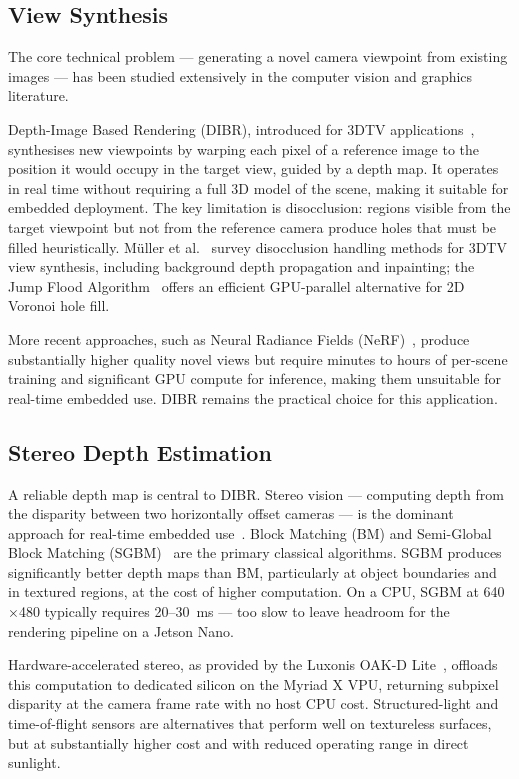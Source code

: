 \documentclass[11pt, a4paper]{report}
\begin{document}
\subsection{View Synthesis}

The core technical problem --- generating a novel camera viewpoint from
existing images --- has been studied extensively in the computer vision
and graphics literature.

Depth-Image Based Rendering (DIBR), introduced for 3DTV
applications~\cite{fehn2004depth,smolic2007coding}, synthesises new
viewpoints by warping each pixel of a reference image to the position it
would occupy in the target view, guided by a depth map.
It operates in real time without requiring a full 3D model of the scene,
making it suitable for embedded deployment.
The key limitation is disocclusion: regions visible from the target
viewpoint but not from the reference camera produce holes that must be
filled heuristically.
M\"{u}ller et al.~\cite{muller2008viewsynth} survey disocclusion handling
methods for 3DTV view synthesis, including background depth propagation
and inpainting; the Jump Flood Algorithm~\cite{rong2006jfa} offers an
efficient GPU-parallel alternative for 2D Voronoi hole fill.

More recent approaches, such as Neural Radiance Fields
(NeRF)~\cite{mildenhall2020nerf}, produce substantially higher quality
novel views but require minutes to hours of per-scene training and
significant GPU compute for inference, making them unsuitable for
real-time embedded use.
DIBR remains the practical choice for this application.

\subsection{Stereo Depth Estimation}

A reliable depth map is central to DIBR.
Stereo vision --- computing depth from the disparity between two
horizontally offset cameras --- is the dominant approach for real-time
embedded use~\cite{scharstein2002taxonomy}.
Block Matching (BM) and Semi-Global Block Matching
(SGBM)~\cite{hirschmuller2005sgbm} are the primary classical algorithms.
SGBM produces significantly better depth maps than BM, particularly at
object boundaries and in textured regions, at the cost of higher
computation.
On a CPU, SGBM at 640$\times$480 typically requires 20--30~ms --- too
slow to leave headroom for the rendering pipeline on a Jetson Nano.

Hardware-accelerated stereo, as provided by the Luxonis OAK-D
Lite~\cite{luxonis_oakd}, offloads this computation to dedicated silicon
on the Myriad X VPU, returning subpixel disparity at the camera frame
rate with no host CPU cost.
Structured-light and time-of-flight sensors are alternatives that perform
well on textureless surfaces, but at substantially higher cost and with
reduced operating range in direct sunlight.
\end{document}
